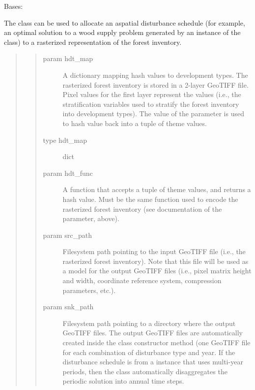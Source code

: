 \documentclass[letterpaper,10pt,english]{sphinxmanual}
\begin{document}
\begin{fulllineitems}
\label{\detokenize{spatial:spatial.ForestRaster}}
Bases: 

The  class can be used to allocate an aspatial disturbance schedule (for example, an optimal solution to a wood supply problem generated by an instance of the  class) to a rasterized representation of the forest inventory.
\begin{quote}
\begin{quote}\begin{description}
\item[{param hdt\_map}] \leavevmode
A dictionary mapping hash values to development types. The rasterized forest inventory is stored in a 2-layer GeoTIFF file. Pixel values for the first layer represent the  values (i.e., the stratification variables used to stratify the forest inventory into development types). The value of the  parameter is used to  hash value back into a tuple of theme values.

\item[{type hdt\_map}] \leavevmode
dict

\item[{param hdt\_func}] \leavevmode
A function that accepts a tuple of theme values, and returns a hash value. Must be the same function used to encode the rasterized forest inventory (see documentation of the  parameter, above).

\item[{param src\_path}] \leavevmode
Filesystem path pointing to the input GeoTIFF file (i.e., the rasterized forest inventory). Note that this file will be used as a model for the output GeoTIFF files (i.e., pixel matrix height and width, coordinate reference system, compression parameters, etc.).

\item[{param snk\_path}] \leavevmode
Filesystem path pointing to a directory where the output GeoTIFF files. The output GeoTIFF files are automatically created inside the class constructor method (one GeoTIFF file for each combination of disturbance type and year. If the disturbance schedule is from a  instance that uses multi-year periods, then the  class automatically disaggregates the periodic solution into annual time steps.


\end{description}
\end{quote}
\end{quote}
\end{fulllineitems}
\end{document}
